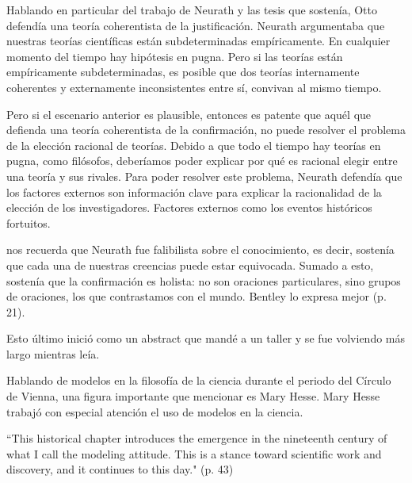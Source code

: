 Hablando en particular del trabajo de Neurath y las tesis que sostenía, Otto defendía una teoría coherentista de la justificación.
Neurath argumentaba que nuestras teorías científicas están subdeterminadas empíricamente.
En cualquier momento del tiempo hay hipótesis en pugna.
Pero si las teorías están empíricamente subdeterminadas, es posible que dos teorías internamente coherentes y externamente inconsistentes entre sí, convivan al mismo tiempo.

Pero si el escenario anterior es plausible, entonces es patente que aquél que defienda una teoría coherentista de la confirmación, no puede resolver el problema de la elección racional de teorías.
Debido a que todo el tiempo hay teorías en pugna, como filósofos, deberíamos poder explicar por qué es racional elegir entre una teoría y sus rivales. Para poder resolver este problema, Neurath defendía que los factores externos son información clave para explicar la racionalidad de la elección de los investigadores.
Factores externos como los eventos históricos fortuitos.

\textcite{Bentley2023} nos recuerda que Neurath fue falibilista sobre el conocimiento, es decir,  sostenía que cada una de nuestras creencias puede estar equivocada.
Sumado a esto, sostenía que la confirmación es holista: no son oraciones particulares, sino grupos de oraciones, los que contrastamos con el mundo.
Bentley lo expresa mejor  (p. 21).



Esto último inició como un abstract que mandé a un taller y se fue volviendo más largo mientras leía.

Hablando de modelos en la filosofía de la ciencia durante el periodo del Círculo de Vienna, una figura importante que mencionar es Mary Hesse.
Mary Hesse trabajó con especial atención el uso de modelos en la ciencia.

``This historical chapter introduces the emergence in the nineteenth century of  what I call the modeling attitude.
This is a stance toward scientific work and  discovery, and it continues to this day." (p. 43)






